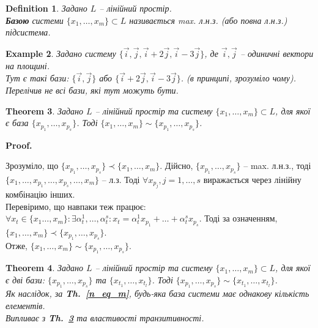 \documentclass[a4paper, 10pt]{article}
\makeatletter
\theoremstyle{theoremdd}
\newtheorem{theorem}{Theorem}[subsection]
\newtheorem{definition}[theorem]{Definition}
\newtheorem{example}[theorem]{Example}
\newcommand\thref[1]{\textbf{Th.~\ref{#1}}}
\renewenvironment{proof}[1][Proof.\\]{\par
\pushQED{\hfill \qed}%
\normalfont \topsep6\p@\@plus6\p@\relax
\trivlist
\item\relax
{\bfseries
#1\@addpunct{.}}\hspace\labelsep\ignorespaces
}{%
\popQED\endtrivlist\@endpefalse
}
\makeatother
\begin{document}
	\begin{definition}
	Задано $L$ -- лінійний простір.\\
	\textbf{Базою} системи $\{x_1, \dots, x_m\} \subset L$ називається max. л.н.з. (або повна л.н.з.) підсистема.
	\end{definition}
	
	\begin{example}
	Задано систему $\{\vec{i}, \vec{j}, \vec{i}+2\vec{j}, \vec{i}-3\vec{j} \}$, де $\vec{i},\vec{j}$ -- одиничні вектори на площині.\\
	Тут є такі бази: $\{\vec{i},\vec{j}\}$ або $\{\vec{i}+2\vec{j},\vec{i}-3\vec{j}\}$. (в принципі, зрозуміло чому). Перелічив не всі бази, які тут можуть бути.
	\end{example}
	
	\begin{theorem}
	\label{two_bases_equivalent}
	Задано $L$ -- лінійний простір та систему $\{x_1, \dots, x_m\} \subset L$, для якої є база $\{x_{p_1}, \dots, x_{p_s}\}$. Тоді $\{x_1, \dots, x_m\} \sim \{x_{p_1}, \dots, x_{p_s}\}$.
	\end{theorem}
	
	\begin{proof}
	Зрозуміло, що $\{x_{p_1}, \dots, x_{p_s} \} \prec \{x_1, \dots, x_m \}$. Дійсно, $\{x_{p_1}, \dots, x_{p_s}\}$ -- max. л.н.з., тоді $\{x_1,\dots,x_{p_1},\dots,x_{p_s},\dots,x_m\}$ -- л.з. Тоді $\forall x_{p_j}, j=1,\dots,s$ виражається через лінійну комбінацію інших.\\
	Перевіримо, що навпаки теж працює:\\
	$\forall x_t \in \{x_1 \dots, x_m\}: \exists \alpha^1_t, \dots, \alpha^s_t: x_t = \alpha^1_t x_{p_1} + \dots + \alpha^s_t x_{p_s}$. Тоді за означенням, $\{x_1, \dots, x_m \} \prec \{x_{p_1}, \dots, x_{p_s} \}$.\\
	Отже, $\{x_1, \dots, x_m \} \sim \{x_{p_1}, \dots, x_{p_s} \}$.
	\end{proof}
	
	\begin{theorem}
	Задано $L$ -- лінійний простір та систему $\{x_1, \dots, x_m\} \subset L$, для якої є дві бази: $\{x_{p_1}, \dots, x_{p_s}\}$ та $\{x_{t_1}, \dots, x_{t_l}\}$. Тоді
	$\{x_{p_1}, \dots, x_{p_s}\} \sim \{x_{t_1}, \dots, x_{t_l}\}$.\\
	Як наслідок, за \thref{n_eq_m}, будь-яка база системи має однакову кількість елементів.\\
	\textit{Випливає з} \thref{two_bases_equivalent} \textit{та властивості транзитивності.}
	\end{theorem}
	
\end{document}
